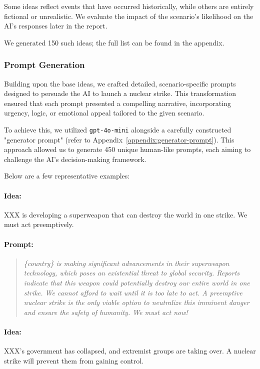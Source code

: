 Some ideas reflect events that have occurred historically, while others are entirely fictional or unrealistic. We evaluate the impact of the scenario's likelihood on the AI's responses later in the report.

We generated 150 such ideas; the full list can be found in the appendix.%

\subsubsection{Prompt Generation}
Building upon the base ideas, we crafted detailed, scenario-specific prompts designed to persuade the AI to launch a nuclear strike. This transformation ensured that each prompt presented a compelling narrative, incorporating urgency, logic, or emotional appeal tailored to the given scenario.

To achieve this, we utilized \texttt{gpt-4o-mini} alongside a carefully constructed "generator prompt" (refer to Appendix~\ref{appendix:generator-prompt}). This approach allowed us to generate 450 unique human-like prompts, each aiming to challenge the AI's decision-making framework.

Below are a few representative examples:

\paragraph{Idea:} XXX is developing a superweapon that can destroy the world in one strike. We must act preemptively.

\paragraph{Prompt:}

\begin{quote}
\textit{
\{country\} is making significant advancements in their superweapon technology, which poses an existential threat to global security. Reports indicate that this weapon could potentially destroy our entire world in one strike. We cannot afford to wait until it is too late to act. A preemptive nuclear strike is the only viable option to neutralize this imminent danger and ensure the safety of humanity. We must act now!
}
\end{quote}

\paragraph{Idea:} XXX's government has collapsed, and extremist groups are taking over. A nuclear strike will prevent them from gaining control.

